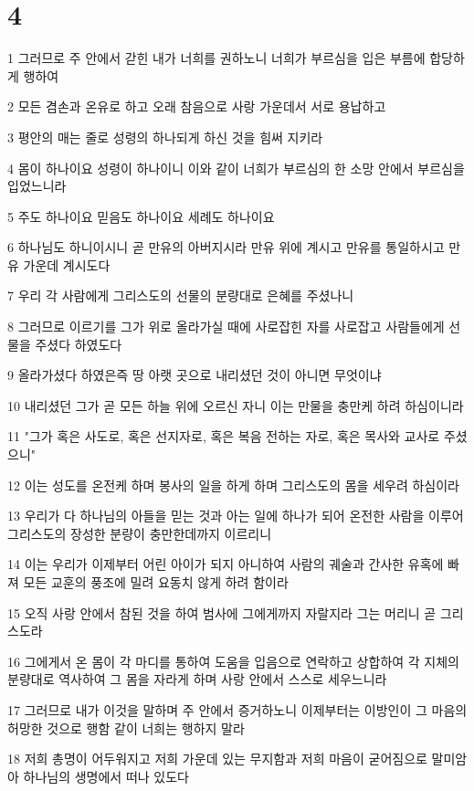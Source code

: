 \chapter{4}

\par 1 그러므로 주 안에서 갇힌 내가 너희를 권하노니 너희가 부르심을 입은 부름에 합당하게 행하여
\par 2 모든 겸손과 온유로 하고 오래 참음으로 사랑 가운데서 서로 용납하고
\par 3 평안의 매는 줄로 성령의 하나되게 하신 것을 힘써 지키라
\par 4 몸이 하나이요 성령이 하나이니 이와 같이 너희가 부르심의 한 소망 안에서 부르심을 입었느니라
\par 5 주도 하나이요 믿음도 하나이요 세례도 하나이요
\par 6 하나님도 하니이시니 곧 만유의 아버지시라 만유 위에 계시고 만유를 통일하시고 만유 가운데 계시도다
\par 7 우리 각 사람에게 그리스도의 선물의 분량대로 은혜를 주셨나니
\par 8 그러므로 이르기를 그가 위로 올라가실 때에 사로잡힌 자를 사로잡고 사람들에게 선물을 주셨다 하였도다
\par 9 올라가셨다 하였은즉 땅 아랫 곳으로 내리셨던 것이 아니면 무엇이냐
\par 10 내리셨던 그가 곧 모든 하늘 위에 오르신 자니 이는 만물을 충만케 하려 하심이니라
\par 11 "그가 혹은 사도로, 혹은 선지자로, 혹은 복음 전하는 자로, 혹은 목사와 교사로 주셨으니"
\par 12 이는 성도를 온전케 하며 봉사의 일을 하게 하며 그리스도의 몸을 세우려 하심이라
\par 13 우리가 다 하나님의 아들을 믿는 것과 아는 일에 하나가 되어 온전한 사람을 이루어 그리스도의 장성한 분량이 충만한데까지 이르리니
\par 14 이는 우리가 이제부터 어린 아이가 되지 아니하여 사람의 궤술과 간사한 유혹에 빠져 모든 교훈의 풍조에 밀려 요동치 않게 하려 함이라
\par 15 오직 사랑 안에서 참된 것을 하여 범사에 그에게까지 자랄지라 그는 머리니 곧 그리스도라
\par 16 그에게서 온 몸이 각 마디를 통하여 도움을 입음으로 연락하고 상합하여 각 지체의 분량대로 역사하여 그 몸을 자라게 하며 사랑 안에서 스스로 세우느니라
\par 17 그러므로 내가 이것을 말하며 주 안에서 증거하노니 이제부터는 이방인이 그 마음의 허망한 것으로 행함 같이 너희는 행하지 말라
\par 18 저희 총명이 어두워지고 저희 가운데 있는 무지함과 저희 마음이 굳어짐으로 말미암아 하나님의 생명에서 떠나 있도다
